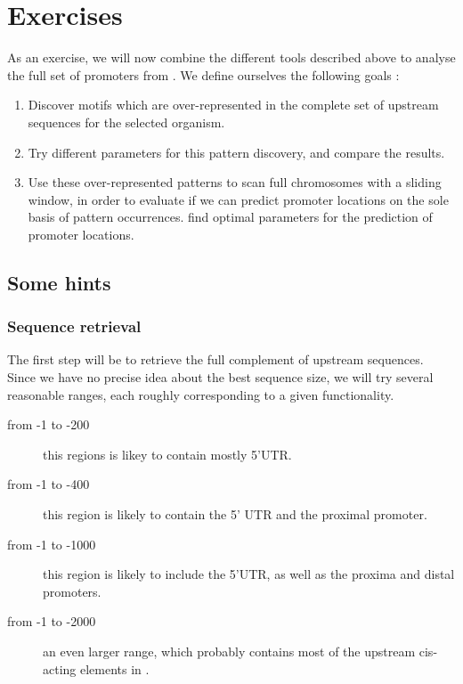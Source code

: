 
\section{Exercises}

As an exercise, we will now combine the different tools described
above to analyse the full set of promoters from . We define ourselves the following goals :
\begin{enumerate}
\item Discover motifs which are over-represented in the complete set
of upstream sequences for the selected organism. 
\item Try different parameters for this pattern discovery, and compare
the results.
\item Use these over-represented patterns to scan full chromosomes
with a sliding window, in order to evaluate if we can predict promoter
locations on the sole basis of pattern occurrences. find optimal
parameters for the prediction of promoter locations.
\end{enumerate}

\subsection{Some hints}

\subsubsection{Sequence retrieval}

The first step will be to retrieve the full complement of upstream
sequences. Since we have no precise idea about the best sequence size,
we will try several reasonable ranges, each roughly corresponding to a
given functionality.

\begin{description}
\item[from -1 to -200] this regions is likey to contain mostly 5'UTR.
\item[from -1 to -400] this region is likely to contain the 5' UTR and
the proximal promoter.
\item[from -1 to -1000] this region is likely to include the 5'UTR,
as well as the proxima and distal promoters. 
\item[from -1 to -2000] an even larger range, which probably contains
most of the upstream cis-acting elements in .
\end{description}

